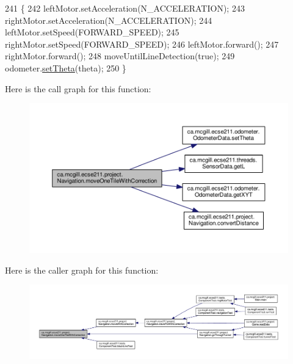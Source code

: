 \begin{DoxyCode}
241                                                       \{
242     leftMotor.setAcceleration(N\_ACCELERATION);
243     rightMotor.setAcceleration(N\_ACCELERATION);
244     leftMotor.setSpeed(FORWARD\_SPEED);
245     rightMotor.setSpeed(FORWARD\_SPEED);
246     leftMotor.forward();
247     rightMotor.forward();
248     moveUntilLineDetection(\textcolor{keyword}{true});
249     odometer.\hyperlink{classca_1_1mcgill_1_1ecse211_1_1odometer_1_1_odometer_data_a419b8f07c2c5374411c8e62298e9a402}{setTheta}(theta);
250   \}
\end{DoxyCode}
Here is the call graph for this function\+:
\nopagebreak
\begin{figure}[H]
\begin{center}
\leavevmode
\includegraphics[width=350pt]{classca_1_1mcgill_1_1ecse211_1_1project_1_1_navigation_afbe677941e2bd44e35452e1eff508ae9_cgraph}
\end{center}
\end{figure}
Here is the caller graph for this function\+:
\nopagebreak
\begin{figure}[H]
\begin{center}
\leavevmode
\includegraphics[width=350pt]{classca_1_1mcgill_1_1ecse211_1_1project_1_1_navigation_afbe677941e2bd44e35452e1eff508ae9_icgraph}
\end{center}
\end{figure}
\mbox{\label{classca_1_1mcgill_1_1ecse211_1_1project_1_1_navigation_a48eeb9ae2da23664421e8da5642054c7}} 
